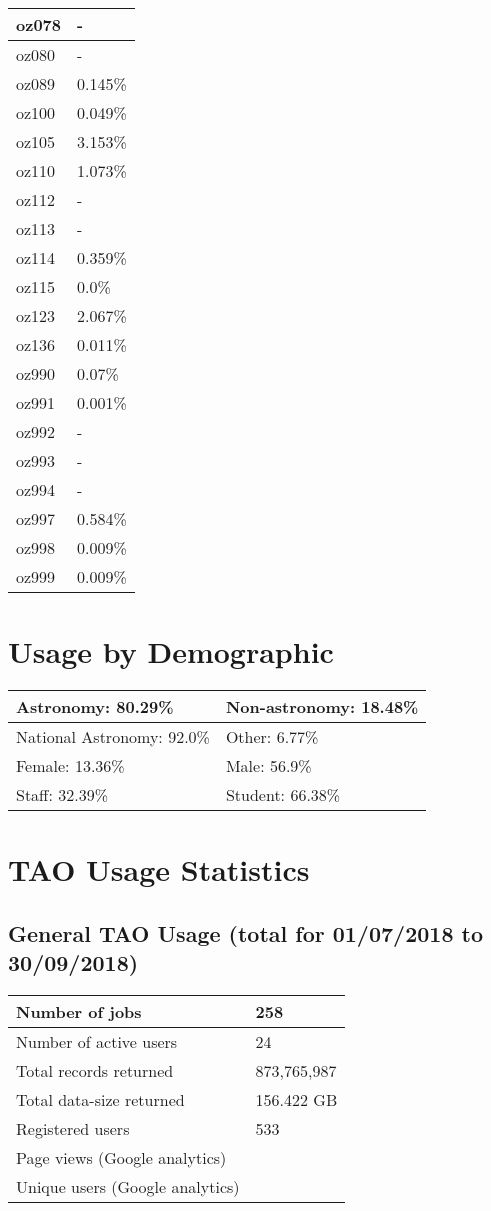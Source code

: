 \documentclass{article}%
\begin{document}
\begin{longtabu}{X[l] X[r]}
\hline%
oz078&{-}\\%
\hline%
oz080&{-}\\%
\hline%
oz089&0.145\%\\%
\hline%
oz100&0.049\%\\%
\hline%
oz105&3.153\%\\%
\hline%
oz110&1.073\%\\%
\hline%
oz112&{-}\\%
\hline%
oz113&{-}\\%
\hline%
oz114&0.359\%\\%
\hline%
oz115&0.0\%\\%
\hline%
oz123&2.067\%\\%
\hline%
oz136&0.011\%\\%
\hline%
oz990&0.07\%\\%
\hline%
oz991&0.001\%\\%
\hline%
oz992&{-}\\%
\hline%
oz993&{-}\\%
\hline%
oz994&{-}\\%
\hline%
oz997&0.584\%\\%
\hline%
oz998&0.009\%\\%
\hline%
oz999&0.009\%\\%
\hline%
\end{longtabu}%
\section{Usage by Demographic}%

%
\begin{longtabu}{X[l] X[l]}%
Astronomy:  80.29\%&Non{-}astronomy:  18.48\%\\%
\hline%
National Astronomy:  92.0\%&Other:  6.77\%\\%
\hline%
Female:  13.36\%&Male:  56.9\%\\%
\hline%
Staff:  32.39\%&Student:  66.38\%\\%
\hline%
\end{longtabu}%
\newpage%
\section{TAO Usage Statistics}%

%
\subsection{General TAO Usage (total for 01/07/2018 to 30/09/2018)}%

%
\begin{longtabu}{X[l] X[l]}%
Number of jobs&258\\%
\hline%
Number of active users&24\\%
\hline%
Total records returned&873,765,987\\%
\hline%
Total data{-}size returned&156.422 GB\\%
\hline%
Registered users&533\\%
\hline%
Page views (Google analytics)&\\%
\hline%
Unique users (Google analytics)&\\%
\hline%
\end{longtabu}%
\end{document}
